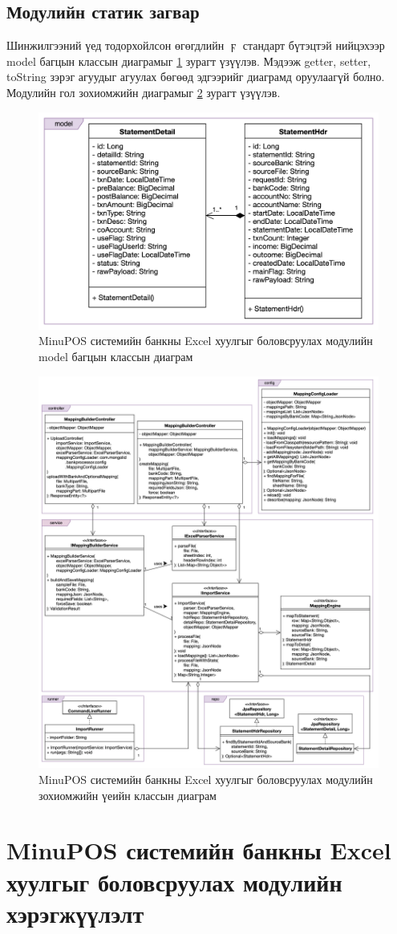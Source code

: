 \subsection{Модулийн статик загвар}
Шинжилгээний үед тодорхойлсон өгөгдлийн  $\digamma$ стандарт бүтэцтэй нийцэхээр model багцын классын диаграмыг \ref{fig:model} зурагт үзүүлэв. Мэдээж getter, setter, toString зэрэг агуудыг агуулах бөгөөд эдгээрийг диаграмд оруулаагүй болно. Модулийн гол зохиомжийн диаграмыг \ref{fig:design} зурагт үзүүлэв.

\begin{figure}[H]
		\centering
		\includegraphics[width=13cm]{images/model.png}
		\caption{MinuPOS системийн банкны Excel хуулгыг боловсруулах модулийн model багцын классын диаграм}
		\label{fig:model}
\end{figure}

\begin{figure}[H]
		\centering
		\includegraphics[width=17cm]{images/design.png}
		\caption{MinuPOS системийн банкны Excel хуулгыг боловсруулах модулийн зохиомжийн үеийн классын диаграм}
		\label{fig:design}
\end{figure}

\newpage
\section{MinuPOS системийн банкны Excel хуулгыг боловсруулах модулийн хэрэгжүүлэлт}
